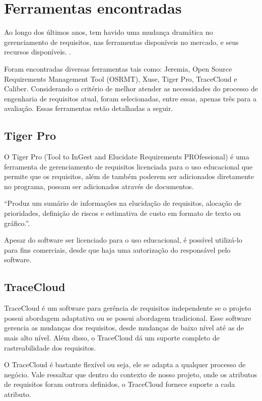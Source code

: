 \section[Ferramentas encontradas]{Ferramentas encontradas}
Ao longo dos últimos anos, tem havido uma mudança dramática no gerenciamento de requisitos, nas ferramentas disponíveis no mercado, e seus recursos disponíveis. \cite{beatty}.

Foram encontradas diversas ferramentas tais como: Jeremia, Open Source Requirements Management Tool (OSRMT), Xuse, Tiger Pro, TraceCloud e Caliber. Considerando o critério de melhor atender as necessidades do processo de engenharia de requisitos atual, foram selecionadas, entre essas, apenas três para a avaliação. Essas ferramentas estão detalhadas a seguir.


\subsection{Tiger Pro}
O Tiger Pro (Tool to InGest and Elucidate Requirements PROfessional) é uma ferramenta de gerenciamento de requisitos licenciada para o uso educacional que permite que os requisitos, além de também poderem ser adicionados diretamente no programa, possam ser adicionados através de documentos.

“Produz um sumário de informações na elucidação de requisitos, alocação de prioridades, definição de riscos e estimativa de custo em formato de texto ou gráfico.”\cite{ananias}.

Apesar do software ser licenciado para o uso educacional, é possível utilizá-lo para fins comerciais, desde que haja uma autorização do responsável pelo software.

\subsection{TraceCloud}
TraceCloud é um software para gerência de requisitos independente se o projeto possui abordagem adaptativa ou se possui abordagem tradicional. Esse software gerencia as mudanças dos requisitos, desde mudanças de baixo nível até as de mais alto nível. Além disso, o TraceCloud dá um suporte completo de rastreabilidade dos requisitos.

O TraceCloud é bastante flexível ou seja, ele se adapta a qualquer processo de negócio. Vale ressaltar que dentro do contexto de nosso projeto, onde os atributos de requisitos foram outrora definidos, o TraceCloud fornece suporte a cada atributo.

